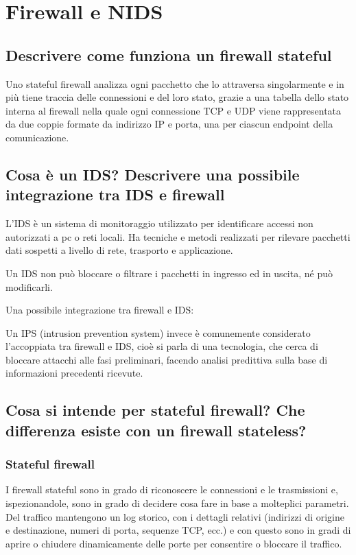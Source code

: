\documentclass{report}
\begin{document}
\chapter{Firewall e NIDS}
\section{Descrivere come funziona un firewall stateful}
Uno stateful firewall analizza ogni pacchetto che lo attraversa singolarmente e in più tiene traccia delle connessioni e del loro stato, grazie 
a una tabella dello stato interna al firewall nella quale ogni connessione TCP e UDP viene rappresentata da due coppie formate da indirizzo IP e porta, 
una per ciascun endpoint della comunicazione.

\section{Cosa è un IDS? Descrivere una possibile integrazione tra IDS e firewall}
L'IDS è un sistema di monitoraggio utilizzato per identificare accessi non autorizzati a pc o reti locali. Ha tecniche e metodi realizzati per rilevare pacchetti 
dati sospetti a livello di rete, trasporto e applicazione. 

\noindent Un IDS non può bloccare o filtrare i pacchetti in ingresso ed in uscita, né può modificarli.

\noindent Una possibile integrazione tra firewall e IDS:

\noindent Un IPS (intrusion prevention system) invece è comunemente considerato l’accoppiata tra firewall e IDS, cioè si parla di una tecnologia, che cerca di bloccare attacchi alle fasi 
preliminari, facendo analisi predittiva sulla base di informazioni precedenti ricevute.

\section{Cosa si intende per stateful firewall? Che differenza esiste con un firewall stateless?}
\subsection{Stateful firewall}
I firewall stateful sono in grado di riconoscere le connessioni e le trasmissioni e, ispezionandole, sono in grado di decidere cosa fare in base a molteplici parametri.
\noindent Del traffico mantengono un log storico, con i dettagli relativi (indirizzi di origine e destinazione, numeri di porta, sequenze TCP, ecc.) e con questo sono in gradi di 
aprire o chiudere dinamicamente delle porte per consentire o bloccare il traffico.
\end{document}
